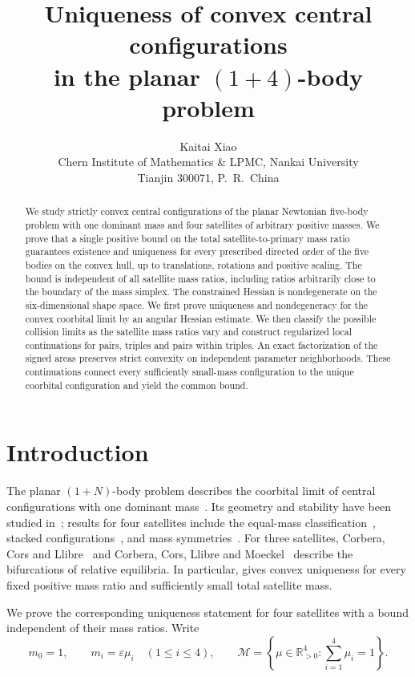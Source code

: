 \documentclass[11pt,a4paper]{article}
\title{Uniqueness of convex central configurations\\
in the planar $(1+4)$-body problem}
\author{Kaitai Xiao\\[3pt]
\small Chern Institute of Mathematics \& LPMC, Nankai University\\
\small Tianjin 300071, P.\ R.\ China
\ifdefempty{\authoremail}{}{\\
\small Corresponding author: \texttt{\authoremail}}}
\date{}
\numberwithin{equation}{section}
\theoremstyle{remark}
\newcommand{\R}{\mathbb R}
\newcommand{\M}{\mathcal M}
\newcommand{\eps}{\varepsilon}
\begin{document}
\maketitle

\begin{abstract}
We study strictly convex central configurations of the planar Newtonian five-body problem with one dominant mass and four satellites of arbitrary positive masses. We prove that a single positive bound on the total satellite-to-primary mass ratio guarantees existence and uniqueness for every prescribed directed order of the five bodies on the convex hull, up to translations, rotations and positive scaling. The bound is independent of all satellite mass ratios, including ratios arbitrarily close to the boundary of the mass simplex. The constrained Hessian is nondegenerate on the six-dimensional shape space. We first prove uniqueness and nondegeneracy for the convex coorbital limit by an angular Hessian estimate. We then classify the possible collision limits as the satellite mass ratios vary and construct regularized local continuations for pairs, triples and pairs within triples. An exact factorization of the signed areas preserves strict convexity on independent parameter neighborhoods. These continuations connect every sufficiently small-mass configuration to the unique coorbital configuration and yield the common bound.
\end{abstract}

\section{Introduction}\label{sec:intro}

The planar $(1+N)$-body problem describes the coorbital limit of central configurations with one dominant mass~\cite{CLN}. Its geometry and stability have been studied in~\cite{Moeckel94,RS}; results for four satellites include the equal-mass classification~\cite{AF,CLO}, stacked configurations~\cite{OC}, and mass symmetries~\cite{DHW}. For three satellites, Corbera, Cors and Llibre~\cite{CCL} and Corbera, Cors, Llibre and Moeckel~\cite{CCLM} describe the bifurcations of relative equilibria. In particular, \cite[Theorem~2]{CCLM} gives convex uniqueness for every fixed positive mass ratio and sufficiently small total satellite mass.

We prove the corresponding uniqueness statement for four satellites with a bound independent of their mass ratios. Write
\begin{equation}\label{eq:masses}
 m_0=1,\qquad m_i=\eps\mu_i\quad(1\le i\le4),\qquad
 \M=\left\{\mu\in\R_{>0}^4:\sum_{i=1}^4\mu_i=1\right\}.
\end{equation}
\end{document}
